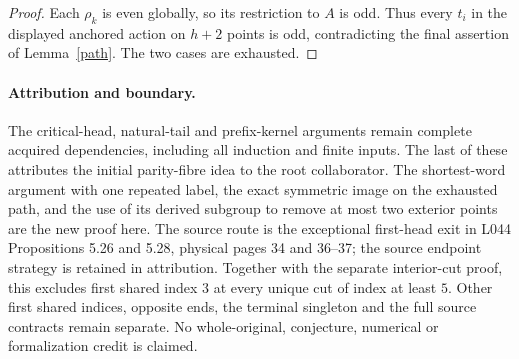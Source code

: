\documentclass[11pt,a4paper]{article}
\begin{document}
\begin{proof}
Each $\rho_k$ is even globally, so its restriction to $A$ is
odd. Thus every $t_i$ in the displayed anchored action on
$h+2$ points is odd, contradicting the final assertion of
Lemma~\ref{path}. The two cases are exhausted.
\end{proof}

\paragraph{Attribution and boundary.}
The critical-head, natural-tail and prefix-kernel arguments remain
complete acquired dependencies, including all induction and finite
inputs. The last of these attributes the initial parity-fibre idea
to the root collaborator. The shortest-word argument with one
repeated label, the exact symmetric image on the exhausted path,
and the use of its derived subgroup to remove at most two exterior
points are the new proof here. The source route is the exceptional
first-head exit in L044 Propositions 5.26 and 5.28, physical pages
34 and 36--37; the source endpoint strategy is retained in attribution.
Together with the separate interior-cut proof, this excludes first
shared index $3$ at every unique cut of index at least $5$.
Other first shared indices, opposite ends, the terminal singleton
and the full source contracts remain separate. No whole-original,
conjecture, numerical or formalization credit is claimed.
\end{document}
